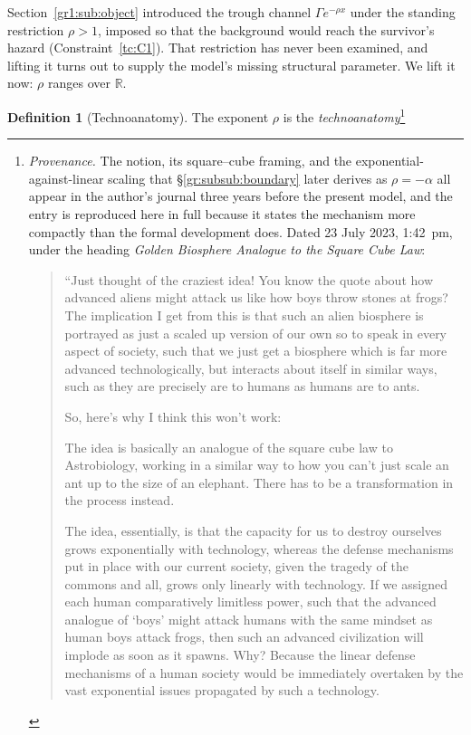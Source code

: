 \documentclass[11pt]{article}
\numberwithin{equation}{section}
\theoremstyle{plain}
\theoremstyle{definition}
\newtheorem{definition}[theorem]{Definition}
\theoremstyle{remark}
\newcommand{\R}{\mathbb{R}}
\begin{document}
Section~\ref{gr1:sub:object} introduced the trough channel
$\Gamma e^{-\rho x}$ under the standing restriction $\rho>1$, imposed so
that the background would reach the survivor's hazard
(Constraint~\ref{tc:C1}). That restriction has never been examined, and
lifting it turns out to supply the model's missing structural
parameter. We lift it now: $\rho$ ranges over $\R$.

\begin{definition}[Technoanatomy]\label{gr1:def:anatomy}
The exponent $\rho$ is the \emph{technoanatomy}\footnote{%
\emph{Provenance.} The notion, its square--cube framing, and the
exponential-against-linear scaling that
\S\ref{gr:subsub:boundary} later derives as $\rho=-\alpha$ all appear in
the author's journal three years before the present model, and the entry
is reproduced here in full because it states the mechanism more
compactly than the formal development does. Dated 23 July 2023,
1:42~pm, under the heading \emph{Golden Biosphere Analogue to the Square
Cube Law}:
\begin{quote}\small
``Just thought of the craziest idea! You know the quote about how
advanced aliens might attack us like how boys throw stones at frogs? The
implication I get from this is that such an alien biosphere is portrayed
as just a scaled up version of our own so to speak in every aspect of
society, such that we just get a biosphere which is far more advanced
technologically, but interacts about itself in similar ways, such as
they are precisely are to humans as humans are to ants.

So, here's why I think this won't work:

The idea is basically an analogue of the square cube law to
Astrobiology, working in a similar way to how you can't just scale an
ant up to the size of an elephant. There has to be a transformation in
the process instead.

The idea, essentially, is that the capacity for us to destroy ourselves
grows exponentially with technology, whereas the defense mechanisms put
in place with our current society, given the tragedy of the commons and
all, grows only linearly with technology. If we assigned each human
comparatively limitless power, such that the advanced analogue of
`boys' might attack humans with the same mindset as human boys attack
frogs, then such an advanced civilization will implode as soon as it
spawns. Why? Because the linear defense mechanisms of a human society
would be immediately overtaken by the vast exponential issues propagated
by such a technology.


\end{quote}}
\end{definition}
\end{document}
